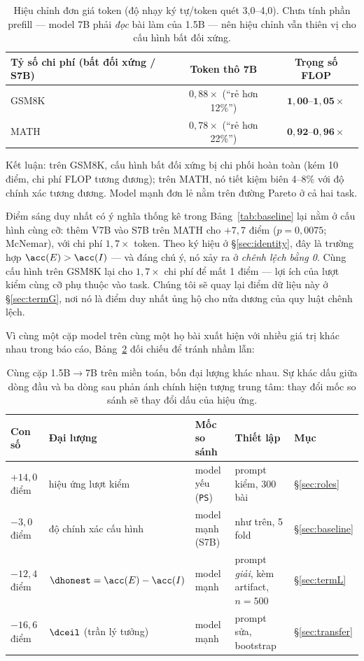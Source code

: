 \begin{table}[h]\centering\small
\begin{tabular}{@{}l c c@{}}
\toprule
Tỷ số chi phí (bất đối xứng / S7B) & Token thô 7B & Trọng số FLOP\\
\midrule
GSM8K & $0{,}88\times$ (``rẻ hơn 12\%'') & $\mathbf{1{,}00\text{--}1{,}05\times}$ \\
MATH & $0{,}78\times$ (``rẻ hơn 22\%'') & $\mathbf{0{,}92\text{--}0{,}96\times}$ \\
\bottomrule
\end{tabular}
\caption{Hiệu chỉnh đơn giá token (độ nhạy ký tự/token quét 3,0--4,0). Chưa tính phần prefill --- model 7B phải \emph{đọc} bài làm của 1.5B --- nên hiệu chỉnh vẫn thiên vị cho cấu hình bất đối xứng.}
\label{tab:flop}
\end{table}

Kết luận: trên GSM8K, cấu hình bất đối xứng bị chi phối hoàn toàn (kém 10 điểm, chi phí FLOP tương đương); trên MATH, nó tiết kiệm biên 4--8\% với độ chính xác tương đương. Model mạnh đơn lẻ nằm trên đường Pareto ở cả hai task.

Điểm sáng duy nhất có ý nghĩa thống kê trong Bảng~\ref{tab:baseline} lại nằm ở cấu hình cùng cỡ: thêm V7B vào S7B trên MATH cho $+7{,}7$ điểm ($p=0{,}0075$; McNemar), với chi phí $1{,}7\times$ token. Theo ký hiệu ở \S\ref{sec:identity}, đây là trường hợp $\acc(E) > \acc(I)$ --- và đáng chú ý, nó xảy ra ở \emph{chênh lệch bằng 0}. Cùng cấu hình trên GSM8K lại cho $1{,}7\times$ chi phí để mất 1 điểm --- lợi ích của lượt kiểm cùng cỡ phụ thuộc vào task. Chúng tôi sẽ quay lại điểm dữ liệu này ở \S\ref{sec:termG}, nơi nó là điểm duy nhất ủng hộ cho nửa dương của quy luật chênh lệch.

Vì cùng một cặp model trên cùng một họ bài xuất hiện với nhiều giá trị khác nhau trong báo cáo, Bảng~\ref{tab:doichieu} đối chiếu để tránh nhầm lẫn:

\begin{table}[h]\centering\small
\begin{tabular}{@{}l l l l l@{}}
\toprule
Con số & Đại lượng & Mốc so sánh & Thiết lập & Mục\\
\midrule
$+14{,}0$ điểm & hiệu ứng lượt kiểm & model yếu (\texttt{PS}) & prompt kiểm, 300 bài & \S\ref{sec:roles}\\
$-3{,}0$ điểm & độ chính xác cấu hình & model mạnh (S7B) & như trên, 5 fold & \S\ref{sec:baseline}\\
$-12{,}4$ điểm & $\dhonest = \acc(E)-\acc(I)$ & model mạnh & prompt \emph{giải}, kèm artifact, $n=500$ & \S\ref{sec:termL}\\
$-16{,}6$ điểm & $\dceil$ (trần lý tưởng) & model mạnh & prompt sửa, bootstrap & \S\ref{sec:transfer}\\
\bottomrule
\end{tabular}
\caption{Cùng cặp 1.5B$\to$7B trên miền toán, bốn đại lượng khác nhau. Sự khác dấu giữa dòng đầu và ba dòng sau phản ánh chính hiện tượng trung tâm: thay đổi mốc so sánh sẽ thay đổi dấu của hiệu ứng.}
\label{tab:doichieu}
\end{table}

